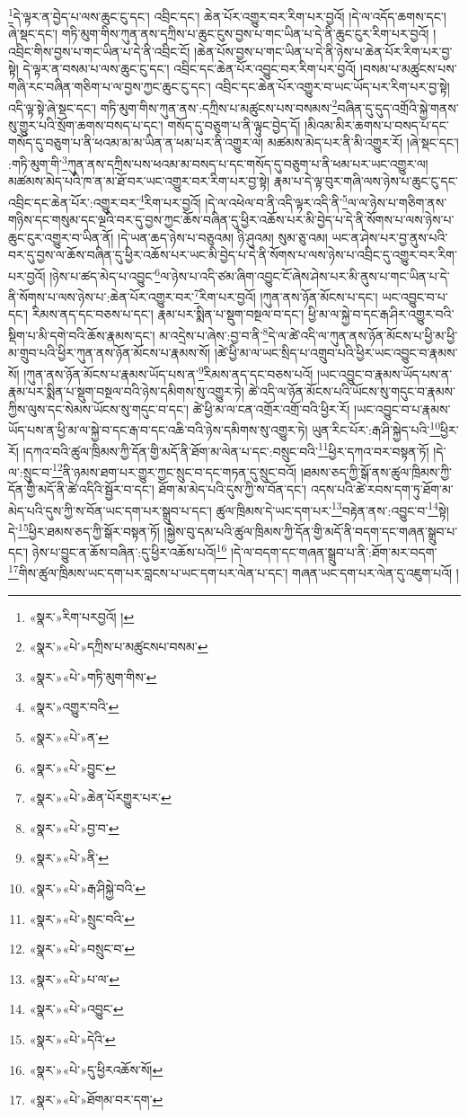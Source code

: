 \footnote{«སྣར་»རིག་པརབྱའོ། ། }དེ་ལྟར་ན་བྱེད་པ་ལས་ཆུང་ངུ་དང་། འབྲིང་དང་། ཆེན་པོར་འགྱུར་བར་རིག་པར་བྱའོ། །དེ་ལ་འདོད་ཆགས་དང་། ཞེ་སྡང་དང་། གཏི་མུག་གིས་ཀུན་ནས་དཀྲིས་པ་ཆུང་ངུས་བྱས་པ་གང་ཡིན་པ་དེ་ནི་ཆུང་ངུར་རིག་པར་བྱའོ། །འབྲིང་གིས་བྱས་པ་གང་ཡིན་པ་དེ་ནི་འབྲིང་ངོ། །ཆེན་པོས་བྱས་པ་གང་ཡིན་པ་དེ་ནི་ཉེས་པ་ཆེན་པོར་རིག་པར་བྱ་སྟེ། དེ་ལྟར་ན་བསམ་པ་ལས་ཆུང་ངུ་དང་། འབྲིང་དང་ཆེན་པོར་འབྱུང་བར་རིག་པར་བྱའོ། །བསམ་པ་མཚུངས་པས་གཞི་རང་བཞིན་གཅིག་པ་ལ་བྱས་ཀྱང་ཆུང་ངུ་དང་། འབྲིང་དང་ཆེན་པོར་འགྱུར་བ་ཡང་ཡོད་པར་རིག་པར་བྱ་སྟེ། འདི་ལྟ་སྟེ་ཞེ་སྡང་དང་། གཏི་མུག་གིས་ཀུན་ནས་:དཀྲིས་པ་མཚུངས་པས་བསམས་\footnote{«སྣར་»«པེ་»དཀྲིས་པ་མཚུངསཔ་བསམ་}བཞིན་དུ་དུད་འགྲོའི་སྐྱེ་གནས་སུ་གྱུར་པའི་སྲོག་ཆགས་བསད་པ་དང་། གསོད་དུ་བཅུག་པ་ནི་ལྟུང་བྱེད་དོ། །མིའམ་མིར་ཆགས་པ་བསད་པ་དང་གསོད་དུ་བཅུག་པ་ནི་ཕའམ་མ་མ་ཡིན་ན་ཕམ་པར་ནི་འགྱུར་ལ། མཚམས་མེད་པར་ནི་མི་འགྱུར་རོ། །ཞེ་སྡང་དང་། :གཏི་མུག་གི་\footnote{«སྣར་»«པེ་»གཏི་མུག་གིས་}ཀུན་ནས་དཀྲིས་པས་ཕའམ་མ་བསད་པ་དང་གསོད་དུ་བཅུག་པ་ནི་ཕམ་པར་ཡང་འགྱུར་ལ། མཚམས་མེད་པའི་ཁ་ན་མ་ཐོ་བར་ཡང་འགྱུར་བར་རིག་པར་བྱ་སྟེ། རྣམ་པ་དེ་ལྟ་བུར་གཞི་ལས་ཉེས་པ་ཆུང་ངུ་དང་འབྲིང་དང་ཆེན་པོར་:འགྱུར་བར་\footnote{«སྣར་»འགྱུར་བའི་}རིག་པར་བྱའོ། །དེ་ལ་འཕེལ་བ་ནི་འདི་ལྟར་འདི་ནི་\footnote{«སྣར་»«པེ་»ན་}ལ་ལ་ཉེས་པ་གཅིག་ནས་གཉིས་དང་གསུམ་དང་ལྔའི་བར་དུ་བྱས་ཀྱང་ཆོས་བཞིན་དུ་ཕྱིར་འཆོས་པར་མི་བྱེད་པ་དེ་ནི་སོགས་པ་ལས་ཉེས་པ་ཆུང་ངུར་འགྱུར་བ་ཡིན་ནོ། །དེ་ཡན་ཆད་ཉེས་པ་བཅུའམ། ཉི་ཤུའམ། སུམ་ཅུ་འམ། ཡང་ན་ཤེས་པར་བྱ་ནུས་པའི་བར་དུ་བྱས་ལ་ཆོས་བཞིན་དུ་ཕྱིར་འཆོས་པར་ཡང་མི་བྱེད་པ་དེ་ནི་སོགས་པ་ལས་ཉེས་པ་འབྲིང་དུ་འགྱུར་བར་རིག་པར་བྱའོ། །ཉེས་པ་ཚད་མེད་པ་འབྱུང་\footnote{«སྣར་»«པེ་»བྱུང་}ལ་ཉེས་པ་འདི་ཙམ་ཞིག་འབྱུང་ངོ་ཞེས་ཤེས་པར་མི་ནུས་པ་གང་ཡིན་པ་དེ་ནི་སོགས་པ་ལས་ཉེས་པ་:ཆེན་པོར་འགྱུར་བར་\footnote{«སྣར་»«པེ་»ཆེན་པོརགྱུར་པར་}རིག་པར་བྱའོ། །ཀུན་ནས་ཉོན་མོངས་པ་དང་། ཡང་འབྱུང་བ་པ་དང་། རིམས་ནད་དང་བཅས་པ་དང་། རྣམ་པར་སྨིན་པ་སྡུག་བསྔལ་བ་དང་། ཕྱི་མ་ལ་སྐྱེ་བ་དང་རྒ་ཤིར་འགྱུར་བའི་སྡིག་པ་མི་དགེ་བའི་ཆོས་རྣམས་དང་། མ་འདྲེས་པ་ཞེས་:བྱ་བ་ནི་\footnote{«སྣར་»«པེ་»བྱ་བ་}དེ་ལ་ཚེ་འདི་ལ་ཀུན་ནས་ཉོན་མོངས་པ་ཕྱི་མ་ཕྱི་མ་གྲུབ་པའི་ཕྱིར་ཀུན་ནས་ཉོན་མོངས་པ་རྣམས་སོ། །ཚེ་ཕྱི་མ་ལ་ཡང་སྲིད་པ་འགྲུབ་པའི་ཕྱིར་ཡང་འབྱུང་བ་རྣམས་སོ། །ཀུན་ནས་ཉོན་མོངས་པ་རྣམས་ཡོད་པས་ན་\footnote{«སྣར་»«པེ་»ནི་}རིམས་ནད་དང་བཅས་པའོ། །ཡང་འབྱུང་བ་རྣམས་ཡོད་པས་ན་རྣམ་པར་སྨིན་པ་སྡུག་བསྔལ་བའི་ཉེས་དམིགས་སུ་འགྱུར་ཏེ། ཚེ་འདི་ལ་ཉོན་མོངས་པའི་ཡོངས་སུ་གདུང་བ་རྣམས་ཀྱིས་ལུས་དང་སེམས་ཡོངས་སུ་གདུང་བ་དང་། ཚེ་ཕྱི་མ་ལ་ངན་འགྲོར་འགྲོ་བའི་ཕྱིར་རོ། །ཡང་འབྱུང་བ་པ་རྣམས་ཡོད་པས་ན་ཕྱི་མ་ལ་སྐྱེ་བ་དང་རྒ་བ་དང་འཆི་བའི་ཉེས་དམིགས་སུ་འགྱུར་ཏེ། ཡུན་རིང་པོར་:རྒ་ཤི་སྐྱེད་པའི་\footnote{«སྣར་»«པེ་»རྒ་ཤིསྐྱེ་བའི་}ཕྱིར་རོ། །དཀའ་བའི་ཚུལ་ཁྲིམས་ཀྱི་དོན་གྱི་མདོ་ནི་ཐོག་མ་ལེན་པ་དང་:བསྲུང་བའི་\footnote{«སྣར་»«པེ་»སྲུང་བའི་}ཕྱིར་དཀའ་བར་བསྟན་ཏོ། །དེ་ལ་:སྲུང་བ་\footnote{«སྣར་»«པེ་»བསྲུང་བ་}ནི་ཉམས་ཐག་པར་གྱུར་ཀྱང་སྲུང་བ་དང་གཏན་དུ་སྲུང་བའོ། །ཐམས་ཅད་ཀྱི་སྒོ་ནས་ཚུལ་ཁྲིམས་ཀྱི་དོན་གྱི་མདོ་ནི་ཚེ་འདིའི་སྦྱོར་བ་དང་། ཐོག་མ་མེད་པའི་དུས་ཀྱི་ས་བོན་དང་། འདས་པའི་ཚེ་རབས་དག་ཏུ་ཐོག་མ་མེད་པའི་དུས་ཀྱི་ས་བོན་ཡང་དག་པར་སྒྲུབ་པ་དང་། ཚུལ་ཁྲིམས་དེ་ཡང་དག་པར་\footnote{«སྣར་»«པེ་»པ་ལ་}བརྟེན་ནས་:འབྱུང་བ་\footnote{«སྣར་»«པེ་»འབྱུང་}སྟེ། དེ་\footnote{«སྣར་»«པེ་»དེའི་}ཕྱིར་ཐམས་ཅད་ཀྱི་སྒོར་བསྟན་ཏོ། །སྐྱེས་བུ་དམ་པའི་ཚུལ་ཁྲིམས་ཀྱི་དོན་གྱི་མདོ་ནི་བདག་དང་གཞན་སྒྲུབ་པ་དང་། ཉེས་པ་བྱུང་ན་ཆོས་བཞིན་:དུ་ཕྱིར་འཆོས་པའོ།\footnote{«སྣར་»«པེ་»དུ་ཕྱིརའཆོས་སོ།} །དེ་ལ་བདག་དང་གཞན་སྒྲུབ་པ་ནི་:ཐོག་མར་བདག་\footnote{«སྣར་»«པེ་»ཐོགམ་བར་དག་}གིས་ཚུལ་ཁྲིམས་ཡང་དག་པར་བླངས་པ་ཡང་དག་པར་ལེན་པ་དང་། གཞན་ཡང་དག་པར་ལེན་དུ་འཇུག་པའོ། །
